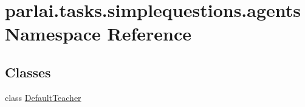 \hypertarget{namespaceparlai_1_1tasks_1_1simplequestions_1_1agents}{}\section{parlai.\+tasks.\+simplequestions.\+agents Namespace Reference}
\label{namespaceparlai_1_1tasks_1_1simplequestions_1_1agents}
\subsection*{Classes}
\begin{DoxyCompactItemize}
\item 
class \hyperlink{classparlai_1_1tasks_1_1simplequestions_1_1agents_1_1DefaultTeacher}{Default\+Teacher}
\end{DoxyCompactItemize}
